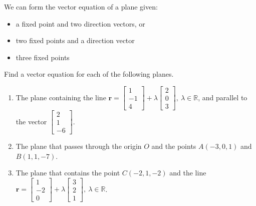 \documentclass[11pt,a4paper]{book}
\newcommand{\R}{\mathbb{R}}
\begin{document}
\newpage

We can form the vector equation of a plane given:
\begin{itemize}
\item a fixed point and two direction vectors, or
\item two fixed points and a direction vector
\item three fixed points
\end{itemize}

\begin{example}

Find a vector equation for each of the following planes.

\begin{enumerate}[label=(\alph*)]

\item  The plane containing the line $\textbf{r}=\begin{bmatrix}1\\
-1\\
4
\end{bmatrix}+\lambda\begin{bmatrix}2\\
0\\
3
\end{bmatrix},\:\lambda\in\R$, and parallel to the vector $\begin{bmatrix}2\\
1\\
-6
\end{bmatrix}$.

\item  The plane that passes through the origin $O$ and the points
$A\left(-3,0,1\right)$ and $B\left(1,1,-7\right)$.

\item  The plane that contains the point $C\left(-2,1,-2\right)$
and the line $\textbf{r}=\begin{bmatrix}1\\
-2\\
0
\end{bmatrix}+\lambda\begin{bmatrix}3\\
2\\
1
\end{bmatrix},\:\lambda\in\R$.

\end{enumerate}

\Solution

\begin{enumerate}[label=(\alph*)]


\end{enumerate}
\end{example}
\end{document}
